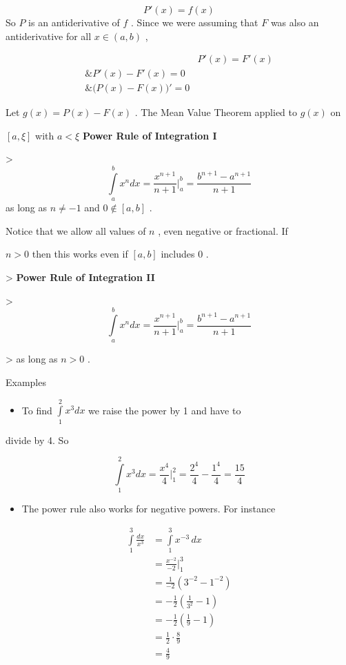 \[
P'(x)=f(x)
\] So $P$ is an antiderivative of $f$ . Since we were assuming that $F$ was also an antiderivative for all $x\in(a,b)$ ,


\begin{align}&P'(x)=F'(x)\\\&P'(x)-F'(x)=0\\\&\Big(P(x)-F(x)\Big)'=0\end{align}


Let $g(x)=P(x)-F(x)$ . The Mean Value Theorem applied to $g(x)$ on

$[a,\xi]$ with $a<\xi$ \textbf{Power Rule of Integration I}

> \[
\int\limits_a^b x^ndx=\frac{x^{n+1}}{n+1}\Bigg| _a^b=\frac{b^{n+1}-a^{n+1}}{n+1}
\] as long as $n\ne-1$ and $0\notin[a,b]$ .


Notice that we allow all values of $n$ , even negative or fractional. If

$n>0$ then this works even if $[a,b]$ includes $0$ .


> \textbf{Power Rule of Integration II}

> \[
\int\limits_a^b x^ndx=\frac{x^{n+1}}{n+1}\Bigg| _a^b=\frac{b^{n+1}-a^{n+1}}{n+1}
\]

> as long as $n>0$ .


Examples


\begin{itemize}
    \item To find $\int\limits_1^2x^3dx$ we raise the power by 1 and have to
\end{itemize}
    divide by 4. So


\[
\int\limits_1^2x^3dx=\frac{x^4}{4}\Bigg| _1^2=\frac{2^4}{4}-\frac{1^4}{4}=\frac{15}{4}
\]


\begin{itemize}
    \item The power rule also works for negative powers. For instance
\end{itemize}

\begin{align}
\int\limits_1^3\frac{dx}{x^3} &= \int\limits_1^3 x^{-3}\,dx \\&= \frac{x^{-2}}{-2}\Bigg| _1^3 \\&= \frac{1}{-2}\left(3^{-2} - 1^{-2}\right) \\&= -\frac{1}{2}\left(\frac{1}{3^2} - 1\right) \\&= -\frac{1}{2}\left(\frac{1}{9} - 1\right) \\&= \frac{1}{2} \cdot \frac{8}{9} \\&= \frac{4}{9}
\end{align}


